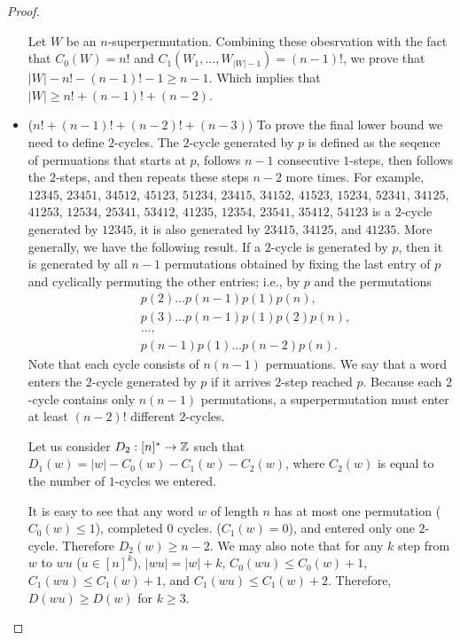 \begin{proof}
\begin{itemize}
      Let $W$ be an $n$-superpermutation. Combining these obesrvation with the
      fact that $C_0(W) = n!$ and $C_1(W_1, \dots, W_{|W| - 1}) = (n - 1)!$, we
      prove that $|W| - n! - (n - 1)! - 1 \ge n - 1$. Which implies that
      $|W| \ge n! + (n - 1)! + (n - 2)$.
    \item ($n! + (n - 1)! + (n - 2)! + (n - 3)$)
      To prove the final lower bound we need to define $2$-cycles. The $2$-cycle
      generated by $p$ is defined as the seqence of permuations that starts at
      $p$, follows $n - 1$ consecutive $1$-steps, then follows the $2$-steps,
      and then repeats these steps $n - 2$ more times. For example,
      $12345$, $23451$, $34512$, $45123$, $51234$, $23415$, $34152$, $41523$,
      $15234$, $52341$, $34125$, $41253$, $12534$, $25341$, $53412$, $41235$,
      $12354$, $23541$, $35412$, $54123$ is a $2$-cycle generated by $12345$,
      it is also generated by $23415$, $34125$, and $41235$. More generally, we
      have the following result. If a $2$-cycle is generated by $p$, then it is
      generated by all $n - 1$ permutations obtained by fixing the
      last entry of $p$ and cyclically permuting the other entries; i.e., by
      $p$ and the permutations
      \begin{align*}
        &p(2) \dots p(n - 1) p(1)p(n), \\
        &p(3) \dots p(n - 1) p(1) p(2) p(n), \\
        &\dots, \\
        &p(n - 1) p(1) \dots p(n - 2) p(n).
      \end{align*}
      Note that each cycle consists of $n (n - 1)$ permuations. We say that a
      word enters the $2$-cycle generated by $p$ if it arrives $2$-step reached
      $p$. Because each $2$-cycle contains only $n (n - 1)$ permutations, a
      superpermutation must enter at least $(n - 2)!$ different $2$-cycles.

      Let us consider $D_2 : [n]^* \to \mathbb{Z}$
      such that $D_1(w) = |w| - C_0(w) - C_1(w) - C_2(w)$, where $C_2(w)$ is
      equal to the number of $1$-cycles we entered.

      It is easy to see that any word $w$ of length $n$ has at most one
      permutation ($C_0(w) \le 1$), completed $0$ cycles.
      ($C_1(w) = 0$), and entered only one $2$-cycle. Therefore
      $D_2(w) \ge n - 2$. We may also
      note that for any $k$ step from $w$ to $wu$ ($u \in [n]^k$),
      $|wu| = |w| + k$, $C_0(wu) \le C_0(w) + 1$, $C_1(wu) \le C_1(w) + 1$, and
      $C_1(wu) \le C_1(w) + 2$.
      Therefore, $D(wu) \ge D(w)$ for $k \ge 3$.


\end{itemize}
\end{proof}
